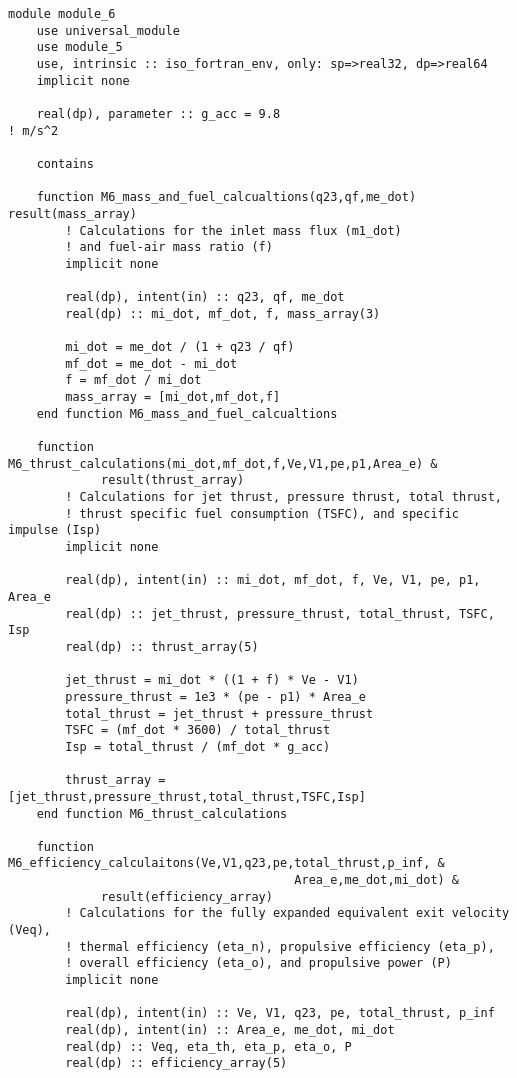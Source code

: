 \begin{verbatim}
module module_6
    use universal_module
    use module_5
    use, intrinsic :: iso_fortran_env, only: sp=>real32, dp=>real64
    implicit none

    real(dp), parameter :: g_acc = 9.8                                   ! m/s^2

    contains

    function M6_mass_and_fuel_calcualtions(q23,qf,me_dot) result(mass_array)
        ! Calculations for the inlet mass flux (m1_dot)
        ! and fuel-air mass ratio (f)
        implicit none

        real(dp), intent(in) :: q23, qf, me_dot
        real(dp) :: mi_dot, mf_dot, f, mass_array(3)

        mi_dot = me_dot / (1 + q23 / qf)
        mf_dot = me_dot - mi_dot
        f = mf_dot / mi_dot
        mass_array = [mi_dot,mf_dot,f]
    end function M6_mass_and_fuel_calcualtions

    function M6_thrust_calculations(mi_dot,mf_dot,f,Ve,V1,pe,p1,Area_e) &
             result(thrust_array)
        ! Calculations for jet thrust, pressure thrust, total thrust,
        ! thrust specific fuel consumption (TSFC), and specific impulse (Isp)
        implicit none

        real(dp), intent(in) :: mi_dot, mf_dot, f, Ve, V1, pe, p1, Area_e
        real(dp) :: jet_thrust, pressure_thrust, total_thrust, TSFC, Isp
        real(dp) :: thrust_array(5)

        jet_thrust = mi_dot * ((1 + f) * Ve - V1)
        pressure_thrust = 1e3 * (pe - p1) * Area_e
        total_thrust = jet_thrust + pressure_thrust
        TSFC = (mf_dot * 3600) / total_thrust
        Isp = total_thrust / (mf_dot * g_acc)

        thrust_array = [jet_thrust,pressure_thrust,total_thrust,TSFC,Isp]
    end function M6_thrust_calculations

    function M6_efficiency_calculaitons(Ve,V1,q23,pe,total_thrust,p_inf, &
                                        Area_e,me_dot,mi_dot) &
             result(efficiency_array)
        ! Calculations for the fully expanded equivalent exit velocity (Veq),
        ! thermal efficiency (eta_n), propulsive efficiency (eta_p),
        ! overall efficiency (eta_o), and propulsive power (P)
        implicit none

        real(dp), intent(in) :: Ve, V1, q23, pe, total_thrust, p_inf
        real(dp), intent(in) :: Area_e, me_dot, mi_dot
        real(dp) :: Veq, eta_th, eta_p, eta_o, P
        real(dp) :: efficiency_array(5)


\end{verbatim}
